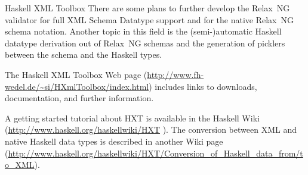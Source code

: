 \begin{hcarentry}[updated]{Haskell XML Toolbox}
There are some plans to further develop the Relax~NG validator
for full XML Schema Datatype support and for the native Relax~NG
schema notation. Another topic in this field is the (semi-)automatic
Haskell datatype derivation out of Relax~NG schemas and the generation
of picklers between the schema and the Haskell types.

\FurtherReading
The Haskell XML Toolbox Web page
(\url{http://www.fh-wedel.de/~si/HXmlToolbox/index.html})
includes links to downloads,  documentation, and further information.

A getting started tutorial about HXT is available
 in the Haskell Wiki (\url{http://www.haskell.org/haskellwiki/HXT}
). The conversion between XML and native Haskell data types is
described in another Wiki page
(\url{http://www.haskell.org/haskellwiki/HXT/Conversion_of_Haskell_data_from/to_XML}).
\end{hcarentry}
